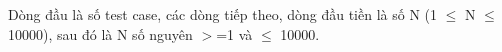 Dòng đầu là số test case, các dòng tiếp theo, dòng đầu tiền là số N (1 $\le$ N  $\le$ 10000),  sau đó là N số nguyên $>$=1 và   $\le$  10000.  



\